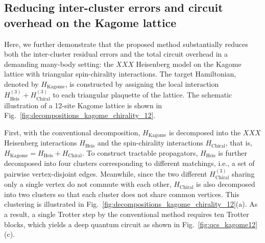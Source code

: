 \documentclass[aps,showpacs,amsmath,amssymb,twocolumn,prx,longbibliography,superscriptaddress,notitlepage,floatfix,10pt]{revtex4-2}
\begin{document}
\subsection{Reducing inter-cluster errors and circuit overhead on the Kagome lattice}

Here, we further demonstrate that the proposed method substantially reduces both the inter-cluster residual errors and the total circuit overhead in a demanding many-body setting: the $XXX$ Heisenberg model on the Kagome lattice with triangular spin-chirality interactions.
The target Hamiltonian, denoted by $H_{\mathrm{Kagome}}$, is constructed by assigning the local interaction $H_{\mathrm{Heis}}^{(3)} + H_{\mathrm{Chiral}}^{(3)}$ to each triangular plaquette of the lattice.
The schematic illustration of a 12-site Kagome lattice is shown in Fig.~\ref{fig:decompositions_kagome_chirality_12}.

First, with the conventional decomposition, $H_{\mathrm{Kagome}}$ is decomposed into the $XXX$ Heisenberg interactions $H_{\mathrm{Heis}}$ and the spin-chirality interactions $H_{\mathrm{Chiral}}$, that is, $H_{\mathrm{Kagome}} = H_{\mathrm{Heis}} + H_{\mathrm{Chiral}}$.
To construct tractable propagators, $H_{\mathrm{Heis}}$ is further decomposed into four clusters corresponding to different matchings, i.e., a set
of pairwise vertex-disjoint edges.
Meanwhile, since the two different $H_{\mathrm{Chiral}}^{(3)}$ sharing only a single vertex do not commute with each other, $H_{\mathrm{Chiral}}$ is also decomposed into two clusters so that each cluster does not share common vertices.
This clustering is illustrated in Fig.~\ref{fig:decompositions_kagome_chirality_12}(a).
As a result, a single Trotter step by the conventional method requires ten Trotter blocks, which yields a deep quantum circuit as shown in Fig.~\ref{fig:qcs_kagome12}(c).
\end{document}
